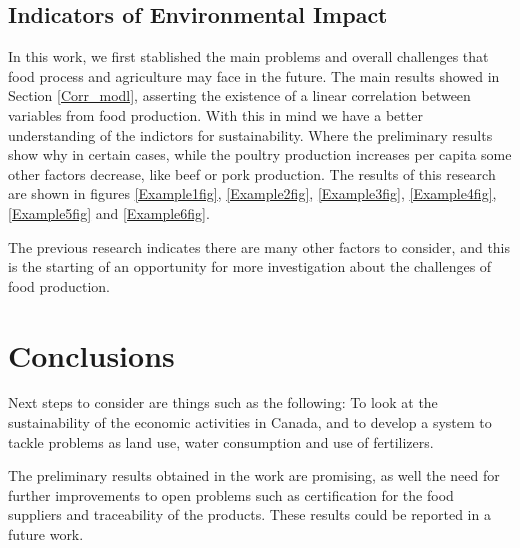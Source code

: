 \documentclass[11pt]{article}
\numberwithin{equation}{section}
\begin{document}

\subsection{Indicators of Environmental Impact}\label{indicators}

In this work, we first stablished the main problems and overall challenges that  food process and agriculture  may face in the future. The main results showed in Section  \ref{Corr_modl}, asserting the existence of a linear correlation between  variables from food production. With this in mind we have a better understanding of the indictors for sustainability. Where the preliminary results show why in certain cases, while the poultry production increases per capita some other factors decrease, like beef or pork production. The results of this research are shown in figures \ref{Example1fig}, \ref{Example2fig}, \ref{Example3fig}, \ref{Example4fig}, \ref{Example5fig}  and \ref{Example6fig}.

The previous research indicates there are many other factors to consider, and this is the starting of an opportunity for more investigation about the challenges of food production. 


\section{Conclusions}

Next steps to consider are things such as the following: To look at the sustainability of the economic activities in Canada, and to develop a system to tackle problems as land use, water consumption and use of fertilizers. 

The preliminary results obtained in the work are promising, as well the need for further improvements to open  problems such as certification for the food suppliers and traceability of the products. These results could be reported in a future work.

\end{document}
